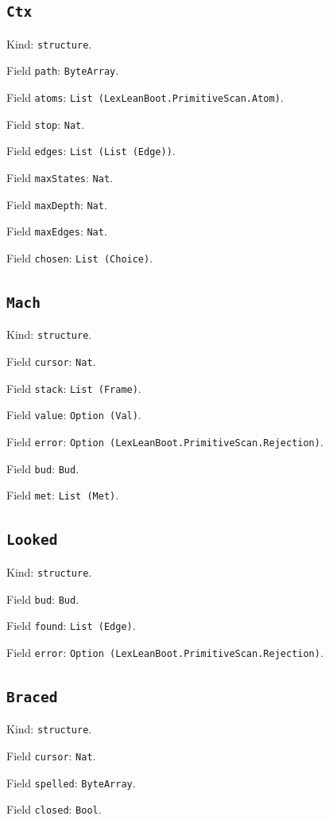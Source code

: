 \documentclass[11pt]{article}
\begin{document}
\subsection*{\texttt{Ctx}}
\noindent Kind: \texttt{structure}.\par
\noindent Field \texttt{path}: \texttt{ByteArray}.\par
\noindent Field \texttt{atoms}: \texttt{List (LexLeanBoot.PrimitiveScan.Atom)}.\par
\noindent Field \texttt{stop}: \texttt{Nat}.\par
\noindent Field \texttt{edges}: \texttt{List (List (Edge))}.\par
\noindent Field \texttt{maxStates}: \texttt{Nat}.\par
\noindent Field \texttt{maxDepth}: \texttt{Nat}.\par
\noindent Field \texttt{maxEdges}: \texttt{Nat}.\par
\noindent Field \texttt{chosen}: \texttt{List (Choice)}.\par
\subsection*{\texttt{Mach}}
\noindent Kind: \texttt{structure}.\par
\noindent Field \texttt{cursor}: \texttt{Nat}.\par
\noindent Field \texttt{stack}: \texttt{List (Frame)}.\par
\noindent Field \texttt{value}: \texttt{Option (Val)}.\par
\noindent Field \texttt{error}: \texttt{Option (LexLeanBoot.PrimitiveScan.Rejection)}.\par
\noindent Field \texttt{bud}: \texttt{Bud}.\par
\noindent Field \texttt{met}: \texttt{List (Met)}.\par
\subsection*{\texttt{Looked}}
\noindent Kind: \texttt{structure}.\par
\noindent Field \texttt{bud}: \texttt{Bud}.\par
\noindent Field \texttt{found}: \texttt{List (Edge)}.\par
\noindent Field \texttt{error}: \texttt{Option (LexLeanBoot.PrimitiveScan.Rejection)}.\par
\subsection*{\texttt{Braced}}
\noindent Kind: \texttt{structure}.\par
\noindent Field \texttt{cursor}: \texttt{Nat}.\par
\noindent Field \texttt{spelled}: \texttt{ByteArray}.\par
\noindent Field \texttt{closed}: \texttt{Bool}.\par
\end{document}
